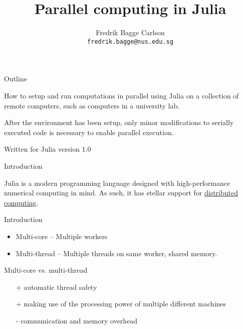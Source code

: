 \documentclass[10pt]{beamer}
\begin{document}
\newlength\figureheight
\newlength\figurewidth
\setlength{\figurewidth}{0.4\textwidth}
\setlength{\figureheight }{4cm }

\title{Parallel computing in Julia}
\author{Fredrik Bagge Carlson\\ \texttt{fredrik.bagge@nus.edu.sg}}

\maketitle
\begin{frame}{Outline}{}

	How to setup and run computations in parallel using Julia on a collection of remote computers, such as computers in a university lab.

	After the environment has been setup, only minor modifications to serially executed code is necessary to enable parallel execution.

	Written for Julia version 1.0

\end{frame}

\begin{frame}{Introduction}

	Julia is a modern programming language designed with high-performance numerical computing in mind. As such, it has stellar support for \href{https://docs.julialang.org/en/v1/manual/parallel-computing/}{distributed computing}.
\end{frame}


\begin{frame}{Introduction}{}
	\begin{itemize}
		\item Multi-core -- Multiple workers
		\item Multi-thread -- Multiple threads on same worker, shared memory.
	\end{itemize}

	Multi-core vs. multi-thread
	\begin{itemize}
		\item[+] automatic thread safety
		\item[+] making use of the processing power of multiple different machines
		\item[-] communication and memory overhead
	\end{itemize}
\end{frame}
\end{document}
